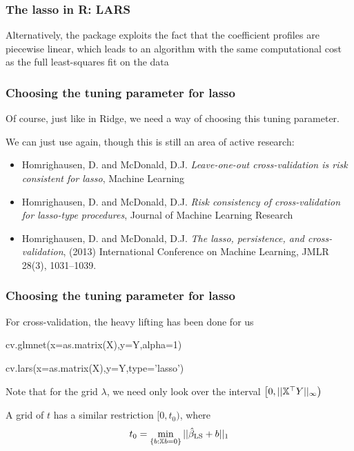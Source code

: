 \documentclass{beamer}
\begin{document}
\begin{frame}[fragile]
\frametitle{The lasso in R: LARS}

Alternatively, the  package exploits the fact that the coefficient 
profiles are piecewise linear, which leads to an algorithm with the same computational
cost as the full least-squares fit on the data 

\end{frame}

\begin{frame}[fragile]
\frametitle{Choosing the tuning parameter for lasso}
Of course, just like in Ridge, we need a way of choosing this tuning parameter.  
\vsp

We can just use  again, though this is still an area of active research:

\vsp
\begin{itemize}
\item[] {\footnotesize Homrighausen, D. and McDonald, D.J. \emph{Leave-one-out cross-validation is risk consistent for lasso},  Machine Learning}
\item[] {\footnotesize Homrighausen, D. and McDonald, D.J. \emph{Risk consistency of cross-validation for lasso-type procedures},  Journal of Machine Learning Research}
\item[] {\footnotesize Homrighausen, D. and McDonald, D.J. \emph{The lasso, persistence, and cross-validation}, 
(2013) International Conference on Machine Learning, JMLR  28(3), 1031--1039.}
\end{itemize}

\end{frame}

\begin{frame}[fragile]
\frametitle{Choosing the tuning parameter for lasso}
For cross-validation, the heavy lifting has been done for us
\vsp

\begin{blockcode}
cv.glmnet(x=as.matrix(X),y=Y,alpha=1)

cv.lars(x=as.matrix(X),y=Y,type='lasso')
\end{blockcode}
Note that for the grid $\lambda$, we need only look over the interval $\left[0,||\mathbb{X}^{\top} Y||_\infty \right)$

\vsp
A grid of $t$ has a similar restriction $[0, t_0)$, where
\[
t_0 = \min_{ \{b : \mathbb{X} b = 0\} } || \hat\beta_{\textrm{LS}}  + b||_1
\]

\end{frame}
\end{document}

